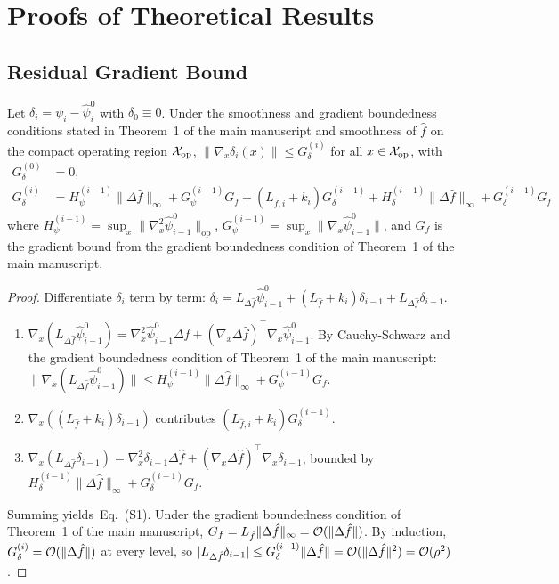 \section{Proofs of Theoretical Results}
\label{sec:appendix_proofs}

\subsection{Residual Gradient Bound}

\begin{lemma}
\label{lem:residual_gradient}
Let $\delta_i = \psi_i - \hat{\psi}_i^0$ with $\delta_0 \equiv 0$. Under the smoothness and gradient boundedness conditions stated in Theorem~1 of the main manuscript and smoothness of $\hat{f}$ on the compact operating region $\mathcal{X}_{\mathrm{op}}$, $\|\nabla_x \delta_i(x)\| \leq G_\delta^{(i)}$ for all $x \in \mathcal{X}_{\mathrm{op}}$, with
\begin{align}
    G_\delta^{(0)} &= 0, \nonumber\\
    G_\delta^{(i)} &= H_\psi^{(i-1)} \|\Delta \hat{f}\|_\infty + G_\psi^{(i-1)} G_f + (L_{\hat f,i} + k_i) G_\delta^{(i-1)} + H_\delta^{(i-1)}\|\Delta\hat f\|_\infty + G_\delta^{(i-1)} G_f
    \label{eq:G_delta_recursive_app}
\end{align}
where $H_\psi^{(i-1)} = \sup_x \|\nabla_x^2 \hat{\psi}_{i-1}^0\|_{\mathrm{op}}$, $G_\psi^{(i-1)} = \sup_x \|\nabla_x \hat{\psi}_{i-1}^0\|$, and $G_f$ is the gradient bound from the gradient boundedness condition of Theorem~1 of the main manuscript.
\end{lemma}

\begin{proof}
Differentiate $\delta_i$ term by term: $\delta_i = L_{\Delta\hat f}\hat\psi_{i-1}^0 + (L_{\hat f}+k_i)\delta_{i-1} + L_{\Delta\hat f}\delta_{i-1}$.
\begin{enumerate}
    \item[(i)] $\nabla_x(L_{\Delta\hat f}\hat\psi_{i-1}^0) = \nabla_x^2\hat\psi_{i-1}^0 \Delta\hat f + (\nabla_x\Delta\hat f)^\top \nabla_x\hat\psi_{i-1}^0$. By Cauchy-Schwarz and the gradient boundedness condition of Theorem~1 of the main manuscript: $\|\nabla_x(L_{\Delta\hat f}\hat\psi_{i-1}^0)\| \leq H_\psi^{(i-1)}\|\Delta\hat f\|_\infty + G_\psi^{(i-1)} G_f$.
    \item[(ii)] $\nabla_x((L_{\hat f}+k_i)\delta_{i-1})$ contributes $(L_{\hat f,i} + k_i) G_\delta^{(i-1)}$.
    \item[(iii)] $\nabla_x(L_{\Delta\hat f}\delta_{i-1}) = \nabla_x^2\delta_{i-1} \Delta\hat f + (\nabla_x\Delta\hat f)^\top \nabla_x\delta_{i-1}$, bounded by $H_\delta^{(i-1)}\|\Delta\hat f\|_\infty + G_\delta^{(i-1)} G_f$.
\end{enumerate}
Summing yields~Eq.~(S1). Under the gradient boundedness condition of Theorem~1 of the main manuscript, $G_f = L_{\hat{f}}\|\Delta\hat f\|_\infty = \mathcal{O}(\|\Delta\hat f\|)$. By induction, $G_\delta^{(i)} = \mathcal{O}(\|\Delta\hat f\|)$ at every level, so $|L_{\Delta\hat f}\delta_{i-1}| \leq G_\delta^{(i-1)}\|\Delta\hat f\| = \mathcal{O}(\|\Delta\hat f\|^2) = \mathcal{O}(\rho^2)$.
\end{proof}

